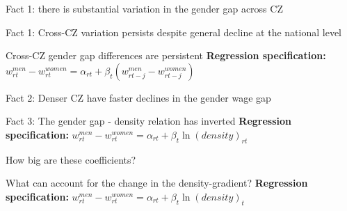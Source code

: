 \begin{frame}{Fact 1: there is substantial variation in the gender gap across CZ} 

\end{frame}
\begin{frame}{Fact 1: Cross-CZ variation persists despite general decline at the national level}
	
\end{frame}
\begin{frame}{Cross-CZ gender gap differences are persistent}
	\textbf{\alert{Regression specification:}} $w^{men}_{rt}-w^{women}_{rt}=\alpha_{rt}+\beta_{t}(w^{men}_{rt-j}-w^{women}_{rt-j})$
	
\end{frame}
\begin{frame}{Fact 2: Denser CZ have faster declines in the gender wage gap}
	
\end{frame}
\begin{frame}{Fact 3: The gender gap - density relation has inverted}  
	\label{slide:baseline}
	\textbf{\alert{Regression specification:}}	$w^{men}_{rt}-w^{women}_{rt}=\alpha_{rt}+\beta_{t}\ln(density)_{rt}$
	
\end{frame}
\begin{frame}{How big are these coefficients?}  
		
\end{frame}
\begin{frame}{What can account for the change in the density-gradient?}
	\label{slide:controls}
	\textbf{\alert{Regression specification:}} $w^{men}_{rt}-w^{women}_{rt}=\alpha_{rt}+\beta_{t}\ln(density)_t$
	
\end{frame}